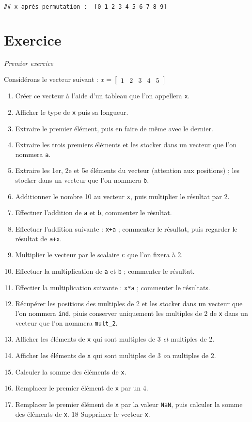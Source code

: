 \documentclass[
  12pt,
]{book}
\makeatletter
\providecommand{\tightlist}{%
  \setlength{\itemsep}{0pt}\setlength{\parskip}{0pt}}
\numberwithin{equation}{section}
\numberwithin{countremarque}{section}
\newenvironment{exframe}{%
 \def\at@end@of@exframe{}%
 \ifinner\ifhmode%
  \def\at@end@of@exframe{\end{minipage}}%
  \begin{minipage}{\columnwidth}%
 \fi\fi%
 \def\FrameCommand##1{\hskip\@totalleftmargin \hskip-\fboxsep
 \colorbox{shadecolorex}{##1}\hskip-\fboxsep
     \hskip-\linewidth \hskip-\@totalleftmargin \hskip\columnwidth}%
 \MakeFramed {\advance\hsize-\width
   \@totalleftmargin\z@ \linewidth\hsize
   \@setminipage}}%
 {\par\unskip\endMakeFramed%
 \at@end@of@exframe}
\makeatother
\begin{document}
\begin{lstlisting}
## x après permutation :  [0 1 2 3 4 5 6 7 8 9]
\end{lstlisting}

\section{Exercice}\label{exercice-7}

\begin{exframe}
\emph{Premier exercice}

Considérons le vecteur suivant : \(x = \begin{bmatrix}1 & 2 & 3 & 4 & 5\end{bmatrix}\)

\begin{enumerate}
\def\labelenumi{\arabic{enumi}.}
\tightlist
\item
  Créer ce vecteur à l'aide d'un tableau que l'on appellera \texttt{x}.
\item
  Afficher le type de \texttt{x} puis sa longueur.
\item
  Extraire le premier élément, puis en faire de même avec le dernier.
\item
  Extraire les trois premiers éléments et les stocker dans un vecteur que l'on nommera \texttt{a}.
\item
  Extraire les 1er, 2e et 5e éléments du vecteur (attention aux positions) ; les stocker dans un vecteur que l'on nommera \texttt{b}.
\item
  Additionner le nombre 10 au vecteur \texttt{x}, puis multiplier le résultat par 2.
\item
  Effectuer l'addition de \texttt{a} et \texttt{b}, commenter le résultat.
\item
  Effectuer l'addition suivante : \texttt{x+a} ; commenter le résultat, puis regarder le résultat de \texttt{a+x}.
\item
  Multiplier le vecteur par le scalaire \texttt{c} que l'on fixera à 2.
\item
  Effectuer la multiplication de \texttt{a} et \texttt{b} ; commenter le résultat.
\item
  Effectier la multiplication suivante : \texttt{x*a} ; commenter le résultats.
\item
  Récupérer les positions des multiples de 2 et les stocker dans un vecteur que l'on nommera \texttt{ind}, piuis conserver uniquement les multiples de 2 de \texttt{x} dans un vecteur que l'on nommera \texttt{mult\_2}.
\item
  Afficher les éléments de \texttt{x} qui sont multiples de 3 \emph{et} multiples de 2.
\item
  Afficher les éléments de \texttt{x} qui sont multiples de 3 \emph{ou} multiples de 2.
\item
  Calculer la somme des éléments de \texttt{x}.
\item
  Remplacer le premier élément de \texttt{x} par un 4.
\item
  Remplacer le premier élément de \texttt{x} par la valeur \texttt{NaN}, puis calculer la somme des éléments de \texttt{x}.
  18 Supprimer le vecteur \texttt{x}.
\end{enumerate}


\end{exframe}
\end{document}
